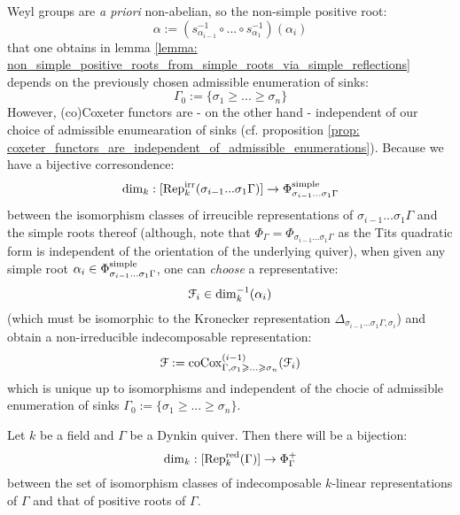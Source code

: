             \begin{remark}
                Weyl groups are \textit{a priori} non-abelian, so the non-simple positive root:
                    $$\alpha := (s_{\alpha_{i - 1}}^{-1} \circ ... \circ s_{\alpha_1}^{-1})(\alpha_i)$$
                that one obtains in lemma \ref{lemma: non_simple_positive_roots_from_simple_roots_via_simple_reflections} depends on the previously chosen admissible enumeration of sinks:
                    $$\Gamma_0 := \{\sigma_1 \geq ... \geq \sigma_n\}$$
                However, (co)Coxeter functors are - on the other hand - independent of our choice of admissible enumearation of sinks (cf. proposition \ref{prop: coxeter_functors_are_independent_of_admissible_enumerations}). Because we have a bijective corresondence:
                    $$\dim_k: [\mathrm{Rep}_k^{\mathrm{irr}}(\sigma_{i - 1} ... \sigma_1\Gamma)] \to \Phi_{\sigma_{i - 1} ... \sigma_1\Gamma}^{\mathrm{simple}}$$
                between the isomorphism classes of irreucible representations of $\sigma_{i - 1} ... \sigma_1\Gamma$ and the simple roots thereof (although, note that $\Phi_{\Gamma} = \Phi_{\sigma_{i - 1} ... \sigma_1 \Gamma}$ as the Tits quadratic form is independent of the orientation of the underlying quiver), when given any simple root $\alpha_i \in \Phi_{\sigma_{i - 1} ... \sigma_1\Gamma}^{\mathrm{simple}}$, one can \textit{choose} a representative:
                    $$\mathcal{F}_i \in \dim_k^{-1}(\alpha_i)$$
                (which must be isomorphic to the Kronecker representation $\Delta_{\sigma_{i - 1} ... \sigma_1\Gamma, \sigma_i}$) and obtain a non-irreducible indecomposable representation:
                    $$\mathcal{F} := \mathrm{co}\mathrm{Cox}^{(i - 1)}_{\Gamma, \sigma_1 \geqslant ... \geqslant \sigma_n}(\mathcal{F}_i)$$
                which is unique up to isomorphisms and independent of the chocie of admissible enumeration of sinks $\Gamma_0 := \{\sigma_1 \geq ... \geq \sigma_n\}$.
            \end{remark}
            \begin{theorem} \label{theorem: indecomposable_representations_of_dynkin_quivers_are_labelled_by_positive_roots}
                Let $k$ be a field and $\Gamma$ be a Dynkin quiver. Then there will be a bijection:
                    $$\dim_k: [\mathrm{Rep}_k^{\mathrm{red}}(\Gamma)] \to \Phi_{\Gamma}^+$$
                between the set of isomorphism classes of indecomposable $k$-linear representations of $\Gamma$ and that of positive roots of $\Gamma$.
            \end{theorem}
